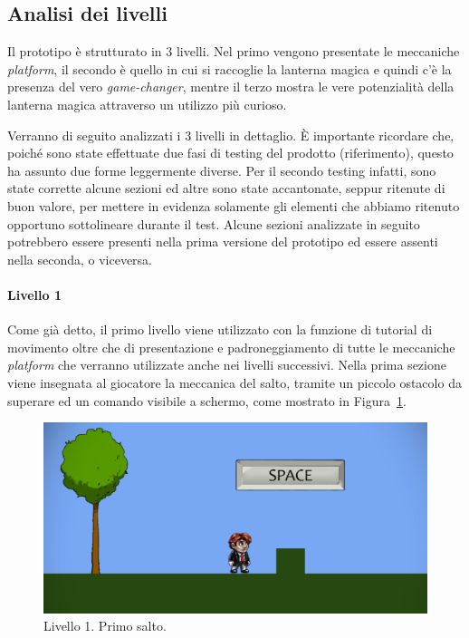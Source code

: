 \subsection{Analisi dei livelli}
\label{sec:analisi_livelli}

Il prototipo è strutturato in 3 livelli. Nel primo vengono presentate le meccaniche \textit{platform}, il secondo è quello in cui si raccoglie la lanterna magica e quindi c’è la presenza del vero \textit{game-changer}, mentre il terzo mostra le vere potenzialità della lanterna magica attraverso un utilizzo più curioso.

Verranno di seguito analizzati i 3 livelli in dettaglio. È importante ricordare che, poiché sono state effettuate due fasi di testing del prodotto (riferimento), questo ha assunto due forme leggermente diverse. Per il secondo testing infatti, sono state corrette alcune sezioni ed altre sono state accantonate, seppur ritenute di buon valore, per mettere in evidenza solamente gli elementi che abbiamo ritenuto opportuno sottolineare durante il test. Alcune sezioni analizzate in seguito potrebbero essere presenti nella prima versione del prototipo ed essere assenti nella seconda, o viceversa.

\paragraph{Livello 1}
\label{par:livello1}

Come già detto, il primo livello viene utilizzato con la funzione di tutorial di movimento oltre che di presentazione e padroneggiamento di tutte le meccaniche \textit{platform} che verranno utilizzate anche nei livelli successivi.
Nella prima sezione viene insegnata al giocatore la meccanica del salto, tramite un piccolo ostacolo da superare ed un comando visibile a schermo, come mostrato in Figura~\ref{fig:livello1_salto}.

\begin{figure}%
	\centering
	\includegraphics[width= 0.8\columnwidth]{images/gameDesign/41_salto.jpg}
	\caption{Livello 1. Primo salto.}
	\label{fig:livello1_salto}
\end{figure}

